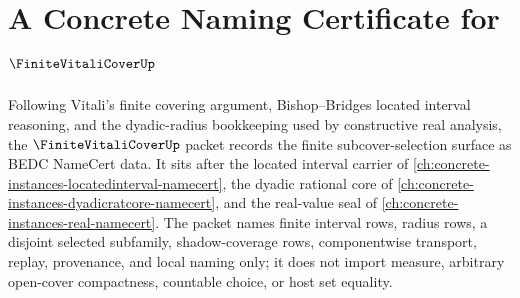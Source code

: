 \chapter{A Concrete Naming Certificate for $\FiniteVitaliCoverUp$}
\label{ch:concrete-instances-finite-vitali-cover-namecert}

Following Vitali's finite covering argument, Bishop--Bridges located interval reasoning, and the dyadic-radius bookkeeping used by constructive real analysis, the $\FiniteVitaliCoverUp$ packet records the finite subcover-selection surface as BEDC NameCert data. It sits after the located interval carrier of \autoref{ch:concrete-instances-locatedinterval-namecert}, the dyadic rational core of \autoref{ch:concrete-instances-dyadicratcore-namecert}, and the real-value seal of \autoref{ch:concrete-instances-real-namecert}. The packet names finite interval rows, radius rows, a disjoint selected subfamily, shadow-coverage rows, componentwise transport, replay, provenance, and local naming only; it does not import measure, arbitrary open-cover compactness, countable choice, or host set equality.


